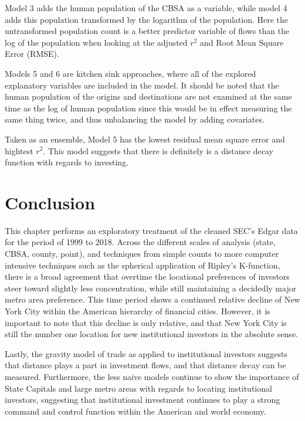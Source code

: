 Model 3 adds the human population of the CBSA as a variable, while model 4 adds this population transformed by the logarithm of the population.  Here the untransformed population count is a better predictor variable of flows than the log of the population when looking at the adjusted $r^{2}$ and Root Mean Square Error (RMSE).  

Models 5 and 6 are kitchen sink approaches, where all of the explored explanatory variables are included in the model.  It should be noted that the human population of the origins and destinations are not examined at the same time as the log of human population since this would be in effect measuring the same thing twice, and thus unbalancing the model by adding covariates.  

Taken as an ensemble, Model 5 has the lowest residual mean square error and hightest $r^{2}$.  This model suggests that there is definitely is a distance decay function with regards to investing.   

\section{Conclusion}

This chapter performs an exploratory treatment of the cleaned SEC's Edgar data for the period of 1999 to 2018.   Across the different scales of analysis (state, CBSA, county, point), and techniques from simple counts to more computer intensive techniques such as the spherical application of Ripley's K-function, there is a broad agreement that overtime the locational preferences of investors steer toward slightly less concentration, while still maintaining a decidedly major metro area preference.  This time period shows a continued relative decline of New York City within the American hierarchy of financial cities.  However, it is important to note that this decline is only relative, and that New York City is still the number one location for new institutional investors in the absolute sense.  

Lastly, the gravity model of trade as applied to institutional investors suggests that distance plays a part in investment flows, and that distance decay can be measured.  Furthermore, the less naive models continue to show the importance of State Capitals and large metro areas with regards to locating institutional investors, suggesting that institutional investment continues to play a strong command and control function within the American and world economy. 
